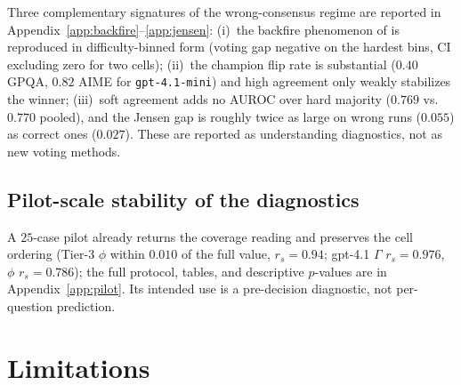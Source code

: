 \documentclass[a4paper,fleqn]{cas-sc}
\newcommand{\agreementIndex}{\Gamma}
\begin{document}
Three complementary signatures of the wrong-consensus regime are reported
in Appendix~\ref{app:backfire}--\ref{app:jensen}: (i)~the backfire
phenomenon of \cite{bahuguna2026when} is reproduced in difficulty-binned
form (voting gap negative on the hardest bins, CI excluding zero for two
cells); (ii)~the champion flip rate is substantial ($0.40$ GPQA, $0.82$
AIME for \texttt{gpt-4.1-mini}) and high agreement only weakly stabilizes
the winner; (iii)~soft agreement adds no AUROC over hard majority
($0.769$ vs.\ $0.770$ pooled), and the Jensen gap is roughly twice as
large on wrong runs ($0.055$) as correct ones ($0.027$). These are
reported as understanding diagnostics, not as new voting methods.

\subsection{Pilot-scale stability of the diagnostics}
\label{sec:res-pilot}

A $25$-case pilot already returns the coverage reading and preserves the
cell ordering (Tier-3 $\phi$ within $0.010$ of the full value,
$r_s=0.94$; gpt-4.1 $\agreementIndex$ $r_s=0.976$, $\phi$ $r_s=0.786$); the full
protocol, tables, and descriptive $p$-values are in
Appendix~\ref{app:pilot}. Its intended use is a pre-decision diagnostic,
not per-question prediction.

\section{Limitations}
\label{sec:limitations}
\end{document}

